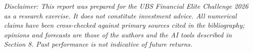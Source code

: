 \documentclass[11pt,a4paper]{article}
\begin{document}
\vspace{0.5cm}

\noindent\textit{\small Disclaimer: This report was prepared for the UBS Financial Elite Challenge 2026 as a research exercise. It does not constitute investment advice. All numerical claims have been cross-checked against primary sources cited in the bibliography; opinions and forecasts are those of the authors and the AI tools described in Section 8. Past performance is not indicative of future returns.}

\printbibliography[heading=bibnumbered,title={References}]
\end{document}

